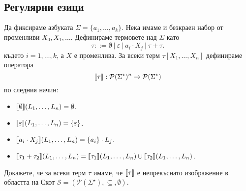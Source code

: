\subsection{Регулярни езици}

Да фиксираме азбуката $\Sigma = \{a_1,\dots,a_k\}$.
Нека имаме и безкраен набор от променливи $X_0,X_1,\dots$.
Дефинираме термовете над $\Sigma$ като
\[\tau ::= \emptyset\ |\ \varepsilon\ |\ a_i \cdot X_j\ |\ \tau + \tau.\]
където $i = 1, \dots,k$, а $X$ е променлива.
За всеки терм $\tau[X_1,\dots,X_n]$ дефинираме оператора 
\[\llbracket{\tau}\rrbracket: \mathcal{P}(\Sigma^\star)^n \to \mathcal{P}(\Sigma^\star)\]
 по следния начин:
\begin{itemize}
\item
    $\llbracket{\emptyset}\rrbracket(L_1,\dots,L_n) = \emptyset$.
\item 
  $\llbracket{\varepsilon}\rrbracket(L_1,\dots,L_n) = \{\varepsilon\}$.
\item 
  $\llbracket{a_i \cdot X_j}\rrbracket(L_1,\dots,L_n) = \{a_i\} \cdot L_j$.
\item
  $\llbracket{\tau_1 + \tau_2}\rrbracket(L_1,\dots,L_n) = \llbracket{\tau_1}\rrbracket(L_1,\dots,L_n) \cup \llbracket{\tau_2}\rrbracket(L_1,\dots,L_n)$.
\end{itemize}

\begin{problem}
  Докажете, че за всеки терм $\tau$ имаме, че $\llbracket{\tau}\rrbracket$ е непрекъснато изображение в областта на Скот
  $\mathcal{S} = ( \mathcal{P}(\Sigma^\star),\subseteq, \emptyset)$.
\end{problem}


